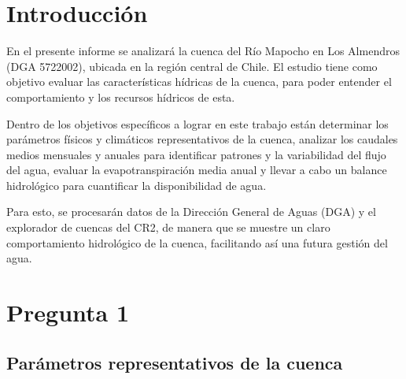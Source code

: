 \documentclass{article} %
\begin{document}
\newpage
\tableofcontents
\thispagestyle{plain} %
\thispagestyle{empty} %
\newpage

\setcounter{page}{1} %

\section{Introducción}
En el presente informe se analizará la cuenca del Río Mapocho en Los Almendros (DGA 5722002), ubicada en la región central de Chile. El estudio tiene como objetivo evaluar las características hídricas de la cuenca, para poder entender el comportamiento y los recursos hídricos de esta.

Dentro de los objetivos específicos a lograr en este trabajo están determinar los parámetros físicos y climáticos representativos de la cuenca, analizar los caudales medios mensuales y anuales para identificar patrones y la variabilidad del flujo del agua, evaluar la evapotranspiración media anual y llevar a cabo un balance hidrológico para cuantificar la disponibilidad de agua.

Para esto, se procesarán datos de la Dirección General de Aguas (DGA) y el explorador de cuencas del CR2, de manera que se muestre un claro comportamiento hidrológico de la cuenca, facilitando así una futura gestión del agua.

\newpage
\section{Pregunta 1}

\subsection{Parámetros representativos de la cuenca}
\end{document}
